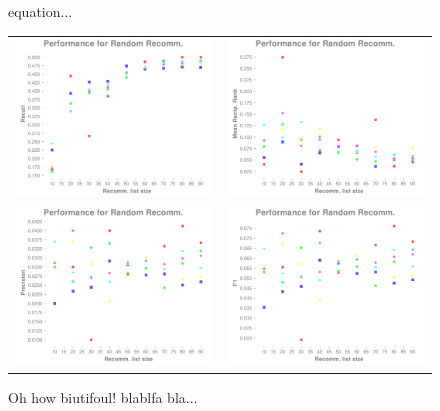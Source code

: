 \documentclass{article}
\begin{document}
\begin{figure}[htp]
\centering
\label{figur}\caption{equation...}
    \begin{tabular}{cc}
    \includegraphics[width=60mm]{Figs/perfo_rand_recall.pdf}&
    \includegraphics[width=60mm]{Figs/perfo_rand_mrr.pdf}\\
    \includegraphics[width=60mm]{Figs/perfo_rand_precis.pdf}&
    \includegraphics[width=60mm]{Figs/perfo_rand_F1.pdf}\\
    \end{tabular}
    \caption{Oh how biutifoul! blablfa bla...}
\end{figure}
\end{document}
